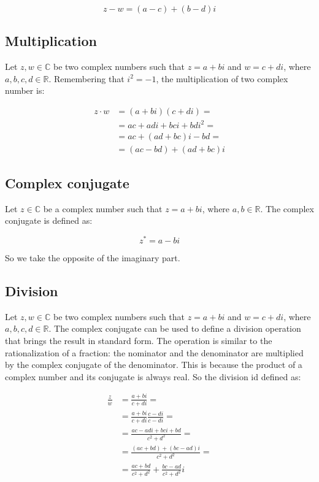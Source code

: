 	$$z-w = (a-c) + (b-d)i$$

	\subsection{Multiplication}
	Let $z, w\in\mathbb{C}$ be two complex numbers such that $z = a+bi$ and $w = c+di$, where $a,b,c,d\in\mathbb{R}$.
	Remembering that $i^2 = -1$, the multiplication of two complex number is:

	\begin{align*}
		z\cdot w &= (a+bi)(c+di) = \\
						 &=ac+adi+bci+bdi^2 =\\
						 &= ac+(ad+bc)i -bd =\\
						 &= (ac-bd)+(ad+bc)i
	\end{align*}

	\subsection{Complex conjugate}
	Let $z\in\mathbb{C}$ be a complex number such that $z=a+bi$, where $a,b\in\mathbb{R}$.
	The complex conjugate is defined as:

	$$z^*=a-bi$$

	So we take the opposite of the imaginary part.

	\subsection{Division}
	Let $z, w\in\mathbb{C}$ be two complex numbers such that $z = a+bi$ and $w = c+di$, where $a,b,c,d\in\mathbb{R}$.
	The complex conjugate can be used to define a division operation that brings the result in standard form.
	The operation is similar to the rationalization of a fraction: the nominator and the denominator are multiplied by the complex conjugate of the denominator.
	This is because the product of a complex number and its conjugate is always real.
	So the division id defined as:

	\begin{align*}
		\frac{z}{w} &= \frac{a+bi}{c+di} = \\
								&=\frac{a+bi}{c+di}\frac{c-di}{c-di}=\\
								&=\frac{ac - adi + bci +bd}{c^2+d^2}=\\
								&= \frac{(ac + bd) + (bc - ad)i}{c^2+d^2} = \\
								&=\frac{ac +bd}{c^2+d^2} + \frac{bc-ad}{c^2+d^2}i
	\end{align*}

